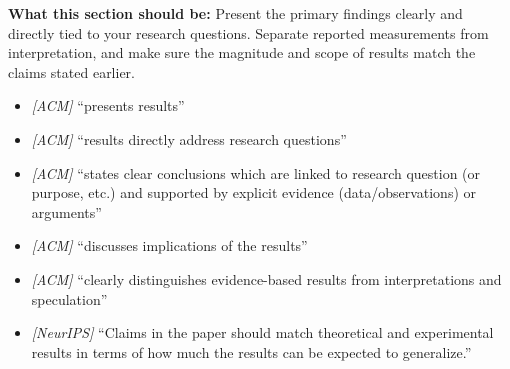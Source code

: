 \noindent\textbf{What this section should be:}
Present the primary findings clearly and directly tied to your research questions. Separate reported measurements from interpretation, and make sure the magnitude and scope of results match the claims stated earlier.
\begin{itemize}
  \item \textit{[ACM]} ``presents results''
  \item \textit{[ACM]} ``results directly address research questions''
  \item \textit{[ACM]} ``states clear conclusions which are linked to research question (or purpose, etc.) and supported by explicit evidence (data/observations) or arguments''
  \item \textit{[ACM]} ``discusses implications of the results''
  \item \textit{[ACM]} ``clearly distinguishes evidence-based results from interpretations and speculation''
  \item \textit{[NeurIPS]} ``Claims in the paper should match theoretical and experimental results in terms of how much the results can be expected to generalize.''
\end{itemize}
